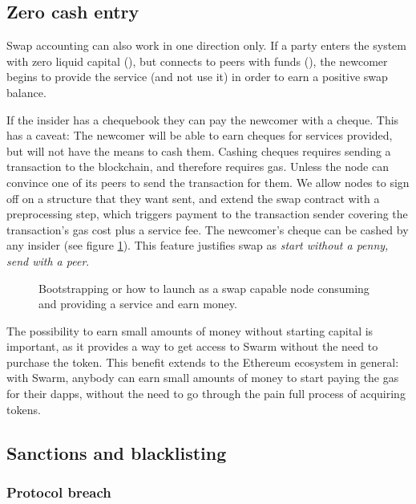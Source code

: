 \subsection{Zero cash entry}\label{sec:zero-cash-entry}


Swap accounting can also work in one direction only. If a party enters the system with zero liquid capital (), but connects to peers with funds (), the newcomer begins to provide the service (and not use it) in order to earn a positive swap balance. 

If the insider has a chequebook they can pay the newcomer with a cheque. This has a caveat: The newcomer will be  able to earn cheques for services provided, but will not have the means to cash them. Cashing cheques requires sending a transaction to the blockchain, and therefore requires gas.  Unless the  node can convince one of its peers to send the transaction for them. We allow nodes to sign off on a structure that they want sent, and extend the swap contract with a preprocessing step, which triggers payment to the transaction sender covering the transaction’s gas cost plus a service fee. The newcomer's cheque can be cashed by any insider (see figure \ref{fig:zero-cash-entry}). This feature justifies swap as \emph{start without a penny, send with a peer}.

\begin{figure}[htbp]
\centering

\caption[Zero cash entry]{Bootstrapping or how to launch as a swap capable node consuming and providing a
service and earn money.}
\label{fig:zero-cash-entry}
\end{figure}

The possibility to earn small amounts of money without starting capital is important, as it provides a way to get access to Swarm without the need to purchase the token. This benefit extends to the Ethereum ecosystem in general: with Swarm, anybody can earn small amounts of money to start paying the gas for their dapps, without the need to go through the pain full process of acquiring tokens. 

\subsection{Sanctions and blacklisting}\label{sec:sanctions}
\red{}
\subsubsection{Protocol breach}

